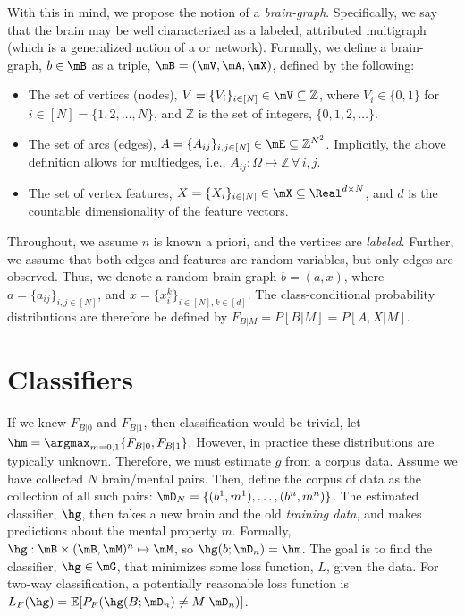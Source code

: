 With this in mind, we propose the notion of a \emph{brain-graph}. Specifically, we say that the brain may be well characterized as a labeled, attributed multigraph (which is a generalized notion of a or network). Formally, we define a brain-graph, $b\in \mB$ as a triple, $\mB=(\mV,\mA,\mX)$, defined by the following:
\begin{itemize}
	\item The set of vertices (nodes), $V=\{V_i\}_{i\in[N]} \in \mV \subseteq \mathbb{Z}$, where $V_i \in \{0,1\}$ for $i \in [N]=\{1,2,\ldots,N\}$, and  $\mathbb{Z}$ is the set of integers, $\{0,1,2,\ldots\}$.  
	\item The set of arcs (edges), $A=\{A_{ij}\}_{i,j \in [N]} \in \mE \subseteq \mathbb{Z}^{N^2}$. Implicitly, the above definition allows for multiedges, i.e.,  $A_{ij}: \Omega \mapsto \mathbb{Z}\, \forall \, i,j$. 
	\item The set of vertex features, $X=\{X_i\}_{i\in[N]} \in \mX \subseteq \Real^{d \times N}$, and $d$ is the countable dimensionality of the feature vectors. 
\end{itemize}

Throughout, we assume $n$ is known a priori, and the vertices are \emph{labeled}.  Further, we assume that both edges and features are random variables, but only edges are observed.  Thus, we denote a random brain-graph $b=(a,x)$, where $a=\{a_{ij}\}_{i,j \in [N]}$, and $x=\{x_i^k\}_{i\in[N], k \in [d]}$.  The class-conditional probability distributions are therefore be defined by $F_{B|M}=P[B | M]=P[A,X|M]$.  







\section{Classifiers} %
\label{sec:classifiers}

If we knew $F_{B|0}$ and $F_{B|1}$, then classification would be trivial, let $\hm=\argmax_{m=0,1} \{F_{B|0}, F_{B|1}\}$.   However, in practice these distributions are typically unknown. Therefore, we must estimate $g$ from a corpus data. Assume we have collected $N$ brain/mental pairs. Then, define the corpus of data as the collection of all such pairs: $\mD_{N}=\{(b^1,m^1), \ldots, (b^n,m^n)\}$. The estimated classifier, $\hg$, then takes a new brain and the old \emph{training data}, and makes predictions about the mental property $m$. Formally, $\hg: \mB \times (\mB, \mM)^n \mapsto \mM$, so $\hg(b; \mD_n)=\hm$.  The goal is to find the classifier, $\hg \in \mG$, that minimizes some loss function, $L$, given the data.  For two-way classification, a potentially reasonable loss function is $L_F(\hg)=\mathbb{E}[P_F(\hg(B;\mD_n) \neq M | \mD_n)]$.  

